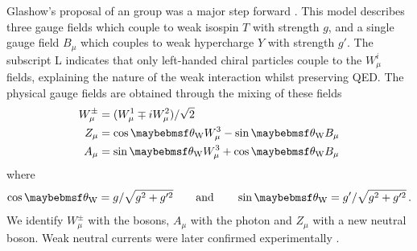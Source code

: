 Glashow's proposal of an \EWgroup group was a major step forward \cite{Glashow:1961}. 
This model describes three gauge fields  
which couple to weak isospin $T$ with strength $g$, and a single gauge field $B_{\mu}$ 
which couples to weak hypercharge $Y$ with strength $g'$. The subscript L indicates 
that only left-handed chiral particles couple to the $W^i_{\mu}$ fields, explaining the 
\VminusA nature of the weak interaction whilst preserving QED. The physical gauge 
fields are obtained through the mixing of these fields
\begin{align}
	W^{\pm}_{\mu} &= (W^1_{\mu} \mp i W^2_{\mu}) / \sqrt{2} \label{eq:Wfield} \\
	Z_{\mu} &= \cos\thetaW W^3_{\mu} - \sin\thetaW B_{\mu} \label{eq:Zfield} \\
	A_{\mu} &= \sin\thetaW W^3_{\mu} + \cos\thetaW B_{\mu} \label{eq:Afield}
\end{align}
where
\begin{equation}
	\cos\thetaW = g/\sqrt{g^2 + g'^2}
	\quad\quad \text{and} \quad\quad
	\sin\thetaW = g'/\sqrt{g^2 + g'^2} \,. 
	\label{eq:weak_mixing}
\end{equation}
We identify $W^{\pm}_{\mu}$ with the \PWpm bosons, $A_{\mu}$ with the photon 
and $Z_{\mu}$ with a new neutral \PZ boson. Weak neutral currents were later confirmed 
experimentally \cite{Gargamelle:1973}. 

